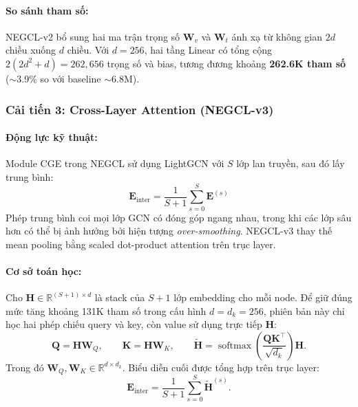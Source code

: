 \paragraph{So sánh tham số:}
NEGCL-v2 bổ sung hai ma trận trọng số $\mathbf{W}_v$ và $\mathbf{W}_t$ ánh xạ từ không gian $2d$ chiều xuống $d$ chiều. Với $d=256$, hai tầng Linear có tổng cộng $2(2d^2+d)=262{,}656$ trọng số và bias, tương đương khoảng \textbf{262.6K tham số} ($\sim$3.9\% so với baseline $\sim$6.8M).


\subsubsection{Cải tiến 3: Cross-Layer Attention (NEGCL-v3)}

\paragraph{Động lực kỹ thuật:}
Module CGE trong NEGCL sử dụng LightGCN với $S$ lớp lan truyền, sau đó lấy trung bình:
\begin{equation}
\mathbf{E}_{\text{inter}} = \frac{1}{S+1} \sum_{s=0}^{S} \mathbf{E}^{(s)}
\label{eq:negcl_v3_baseline}
\end{equation}
Phép trung bình coi mọi lớp GCN có đóng góp ngang nhau, trong khi các lớp sâu hơn có thể bị ảnh hưởng bởi hiện tượng \textit{over-smoothing}. NEGCL-v3 thay thế mean pooling bằng scaled dot-product attention trên trục layer.

\paragraph{Cơ sở toán học:}
Cho $\mathbf{H} \in \mathbb{R}^{(S+1) \times d}$ là stack của $S+1$ lớp embedding cho mỗi node. Để giữ đúng mức tăng khoảng 131K tham số trong cấu hình $d=d_k=256$, phiên bản này chỉ học hai phép chiếu query và key, còn value sử dụng trực tiếp $\mathbf H$:
\begin{equation}
\mathbf Q=\mathbf H\mathbf W_Q,
\qquad
\mathbf K=\mathbf H\mathbf W_K,
\qquad
\widetilde{\mathbf H}=\operatorname{softmax}\!\left(\frac{\mathbf Q\mathbf K^\top}{\sqrt{d_k}}\right)\mathbf H.
\end{equation}
Trong đó $\mathbf W_Q,\mathbf W_K\in\mathbb R^{d\times d_k}$. Biểu diễn cuối được tổng hợp trên trục layer:
\begin{equation}
\mathbf{E}_{\text{inter}} = \frac{1}{S+1} \sum_{s=0}^{S} \widetilde{\mathbf H}^{(s)}.
\end{equation}


